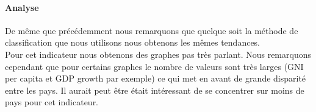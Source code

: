 \paragraph{Analyse}
De même que précédemment nous remarquons que quelque soit la méthode de classification que nous utilisons nous obtenons les mêmes tendances.\\
Pour cet indicateur nous obtenons des graphes pas très parlant. Nous remarquons cependant que pour certains graphes le nombre de valeurs sont très larges (GNI per capita et GDP growth par exemple) ce qui met en avant de grande disparité entre les pays. Il aurait peut être était intéressant de se concentrer sur moins de pays pour cet indicateur.



